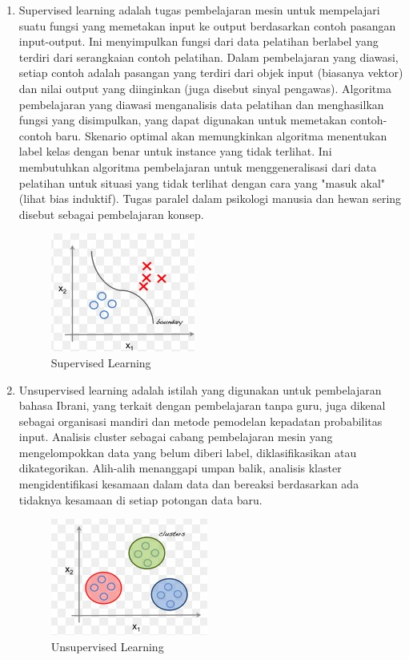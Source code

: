 \begin{enumerate}
\item Supervised learning adalah tugas pembelajaran mesin untuk mempelajari suatu fungsi yang memetakan input ke output berdasarkan contoh pasangan input-output. Ini menyimpulkan fungsi dari data pelatihan berlabel yang terdiri dari serangkaian contoh pelatihan. Dalam pembelajaran yang diawasi, setiap contoh adalah pasangan yang terdiri dari objek input (biasanya vektor) dan nilai output yang diinginkan (juga disebut sinyal pengawas). Algoritma pembelajaran yang diawasi menganalisis data pelatihan dan menghasilkan fungsi yang disimpulkan, yang dapat digunakan untuk memetakan contoh-contoh baru. Skenario optimal akan memungkinkan algoritma menentukan label kelas dengan benar untuk instance yang tidak terlihat. Ini membutuhkan algoritma pembelajaran untuk menggeneralisasi dari data pelatihan untuk situasi yang tidak terlihat dengan cara yang "masuk akal" (lihat bias induktif). Tugas paralel dalam psikologi manusia dan hewan sering disebut sebagai pembelajaran konsep.

\begin{figure}[ht]
\centering
\includegraphics[scale=0.5]{figures/f2.jpg}
\caption{Supervised Learning}
\label{contoh}
\end{figure}

\item Unsupervised learning adalah istilah yang digunakan untuk pembelajaran bahasa Ibrani, yang terkait dengan pembelajaran tanpa guru, juga dikenal sebagai organisasi mandiri dan metode pemodelan kepadatan probabilitas input. Analisis cluster sebagai cabang pembelajaran mesin yang mengelompokkan data yang belum diberi label, diklasifikasikan atau dikategorikan. Alih-alih menanggapi umpan balik, analisis klaster mengidentifikasi kesamaan dalam data dan bereaksi berdasarkan ada tidaknya kesamaan di setiap potongan data baru.

\begin{figure}[ht]
\centering
\includegraphics[scale=0.5]{figures/f3.jpg}
\caption{Unsupervised Learning}
\label{contoh}
\end{figure}


\end{enumerate}

